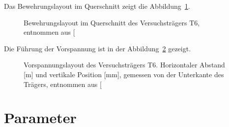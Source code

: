 \documentclass[
  11pt,
  letterpaper,
]{scrreprt}
\begin{document}
Das Bewehrungslayout im Querschnitt zeigt die
Abbildung~\ref{fig-bewehrung_qs_t6}.

\begin{figure}[H]


\caption{\label{fig-bewehrung_qs_t6}Bewehrungslayout im Querschnitt des
Versuchsträgers T6, entnommen aus
{[}\citeproc{ref-sigrist_versuche_1993}{5}{]}}

\end{figure}%

Die Führung der Vorspannung ist in der
Abbildung~\ref{fig-vorspannung_t6} gezeigt.

\begin{figure}[H]


\caption{\label{fig-vorspannung_t6}Vorspannungslayout des
Versuchsträgers T6. Horizontaler Abstand {[}m{]} und vertikale Position
{[}mm{]}, gemessen von der Unterkante des Trägers, entnommen aus
{[}\citeproc{ref-sigrist_versuche_1993}{5}{]}}

\end{figure}%

\section{Parameter}\label{parameter}
\end{document}
